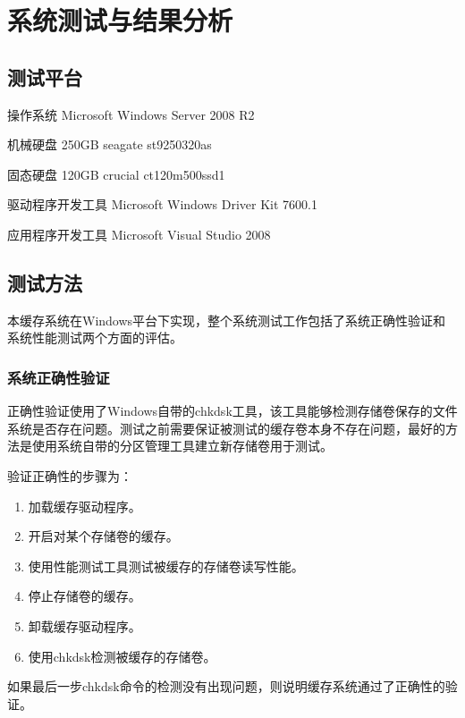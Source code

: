 
\chapter{系统测试与结果分析}
\label{cha:exp_analysis}

\section{测试平台}
\label{sec:exp_platform}

操作系统 Microsoft Windows Server 2008 R2

机械硬盘 250GB seagate st9250320as

固态硬盘 120GB crucial ct120m500ssd1

驱动程序开发工具 Microsoft Windows Driver Kit 7600.1

应用程序开发工具 Microsoft Visual Studio 2008

\section{测试方法}
\label{sec:exp_method}

本缓存系统在Windows平台下实现，整个系统测试工作包括了系统正确性验证和系统性能测试两个方面的评估。

\subsection{系统正确性验证}

正确性验证使用了Windows自带的chkdsk工具，该工具能够检测存储卷保存的文件系统是否存在问题。测试之前需要保证被测试的缓存卷本身不存在问题，最好的方法是使用系统自带的分区管理工具建立新存储卷用于测试。

验证正确性的步骤为：
\begin{enumerate}
\item 加载缓存驱动程序。
\item 开启对某个存储卷的缓存。
\item 使用性能测试工具测试被缓存的存储卷读写性能。
\item 停止存储卷的缓存。
\item 卸载缓存驱动程序。
\item 使用chkdsk检测被缓存的存储卷。
\end{enumerate}

如果最后一步chkdsk命令的检测没有出现问题，则说明缓存系统通过了正确性的验证。

